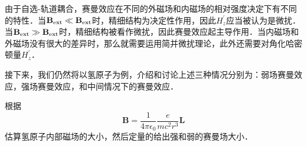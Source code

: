 由于自选-轨道耦合，赛曼效应在不同的外磁场和内磁场的相对强度决定下有不同的特性．当$\mathbf{B}_{\rm{ext}}\ll \mathbf{B}_{\rm{ext}}$时，精细结构为决定性作用，因此$H_z^{'}$应当被认为是微扰．当$\mathbf{B}_{\rm{ext}}\gg \mathbf{B}_{\rm{ext}}$时，精细结构被看作微扰，因此赛曼效应起主导作用．当内磁场和外磁场没有很大的差异时，那么就需要运用简并微扰理论，此外还需要对角化哈密顿量$H_z^{'}$．

接下来，我们仍然将以氢原子为例，介绍和讨论上述三种情况分别为：弱场赛曼效应，强场赛曼效应，和中间情况下的赛曼效应．
\begin{exercise}{}
根据
\begin{equation}
\mathbf{B}=\frac{1}{4\pi\epsilon_0}\frac{e}{mc^2r^3}\mathbf{L}
\end{equation}
估算氢原子内部磁场的大小，然后定量的给出强和弱的赛曼场大小．
\end{exercise}
